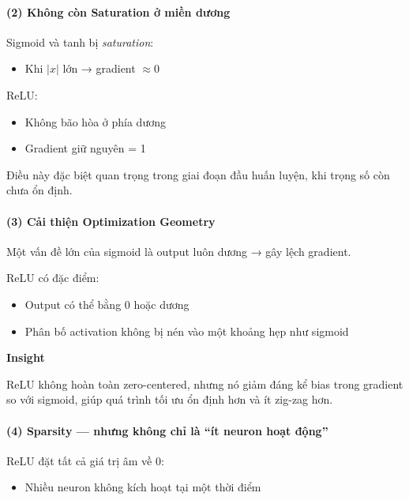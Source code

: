 \paragraph{(2) Không còn Saturation ở miền dương}

Sigmoid và tanh bị \textit{saturation}:
\begin{itemize}
	\item Khi $|x|$ lớn → gradient $\approx 0$
\end{itemize}

ReLU:
\begin{itemize}
	\item Không bão hòa ở phía dương
	\item Gradient giữ nguyên = 1
\end{itemize}

Điều này đặc biệt quan trọng trong giai đoạn đầu huấn luyện, khi trọng số còn chưa ổn định.

\paragraph{(3) Cải thiện Optimization Geometry}

Một vấn đề lớn của sigmoid là output luôn dương → gây lệch gradient.

ReLU có đặc điểm:

\begin{itemize}
	\item Output có thể bằng 0 hoặc dương
	\item Phân bố activation không bị nén vào một khoảng hẹp như sigmoid
\end{itemize}

\begin{mdframed}[style=infobox]
	\textbf{Insight}
	
	ReLU không hoàn toàn zero-centered, nhưng nó giảm đáng kể bias trong gradient so với sigmoid, giúp quá trình tối ưu ổn định hơn và ít zig-zag hơn.
\end{mdframed}

\paragraph{(4) Sparsity — nhưng không chỉ là “ít neuron hoạt động”}

ReLU đặt tất cả giá trị âm về 0:

\begin{itemize}
	\item Nhiều neuron không kích hoạt tại một thời điểm
\end{itemize}

